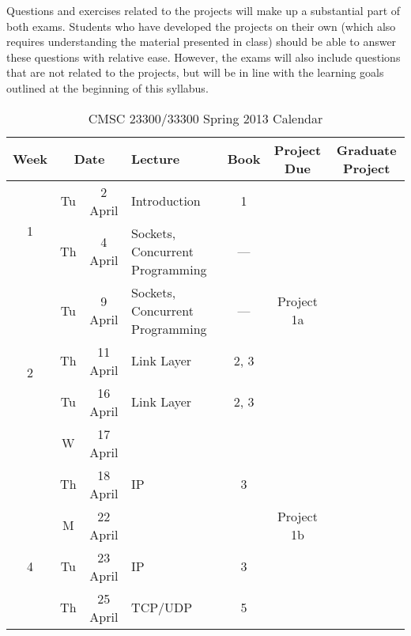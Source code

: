 \documentclass[11pt]{article}
\begin{document}
Questions and exercises related to the projects will make up a substantial part of both exams. Students who have developed the projects on their own (which also requires understanding the material presented in class) should be able to answer these questions with relative ease. However, the exams will also include questions that are not related to the projects, but will be in line with the learning goals outlined at the beginning of this syllabus.


\begin{sidewaystable}
\sffamily
\setlength{\extrarowheight}{4pt}
\caption{CMSC 23300/33300 Spring 2013 Calendar}
\begin{tabular}{|c|cc||p{8cm}|c|c|c|}
\hline
\textbf{Week} &  \multicolumn{2}{|c||}{\textbf{Date}} & \textbf{Lecture} & \textbf{Book} & \textbf{Project Due} & \textbf{Graduate Project} \\\hline

\multirow{2}{*}{1}  & Tu & 2 April & Introduction                                    & 1 & \cellcolor[gray]{0.9}  & \cellcolor[gray]{0.9} \\\cline{2-6}
                    & Th & 4 April & Sockets, Concurrent Programming                 & --- & \cellcolor[gray]{0.9}  & \cellcolor[gray]{0.9} \\\hline\hline

\multirow{4}{*}{2}  & Tu & 9 April & Sockets, Concurrent Programming                & --- & Project 1a  & \cellcolor[gray]{0.9} \\\cline{2-6}
                    & Th & 11 April & Link Layer                                     & 2, 3 & \cellcolor[gray]{0.9} & \cellcolor[gray]{0.9} \\\hline\hline

\multirow{3}{*}{3}  & Tu & 16 April & Link Layer          & 2, 3 & \cellcolor[gray]{0.9}  & \cellcolor[gray]{0.9} \\\cline{2-6}
                    & W & 17 April & \cellcolor[gray]{0.9} & \cellcolor[gray]{0.9} & \cellcolor[gray]{0.9} & \cellcolor[gray]{0.9} \\\cline{2-6}
                    & Th & 18 April & IP          & 3 & \cellcolor[gray]{0.9}  & \cellcolor[gray]{0.9} \\\hline\hline

\multirow{3}{*}{4}  & M & 22 April & \cellcolor[gray]{0.9} & \cellcolor[gray]{0.9} &  Project 1b & \cellcolor[gray]{0.9} \\\cline{2-6}
                    & Tu & 23 April & IP             & 3 & \cellcolor[gray]{0.9}  & \cellcolor[gray]{0.9} \\\cline{2-6}
                    & Th & 25 April & TCP/UDP                 & 5 & \cellcolor[gray]{0.9}  & \cellcolor[gray]{0.9} \\\hline\hline


\end{tabular}
\end{sidewaystable}
\end{document}
